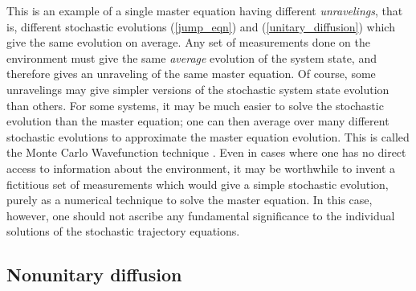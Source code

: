 This is an example of a single master equation having different
{\it unravelings}, that is, different stochastic evolutions
(\ref{jump_eqn}) and (\ref{unitary_diffusion}) which give
the same evolution on average.  Any set of measurements done on the
environment must give the same {\it average} evolution of the system state,
and therefore gives an unraveling of the same master equation.  Of
course, some unravelings may give simpler versions of the stochastic
system state evolution than others.  For some systems, it may be much
easier to solve the stochastic evolution than the master equation; one
can then average over many different stochastic evolutions to approximate
the master equation evolution.  This is called the Monte Carlo Wavefunction
technique \cite{Dalibard}.  Even in cases where one has no direct
access to information about the environment,
it may be worthwhile to invent a fictitious set
of measurements which would give a simple stochastic evolution, purely
as a numerical technique to solve the master equation.  In this case,
however, one should not ascribe any fundamental significance to the
individual solutions of the stochastic trajectory equations.

\subsection{Nonunitary diffusion}

